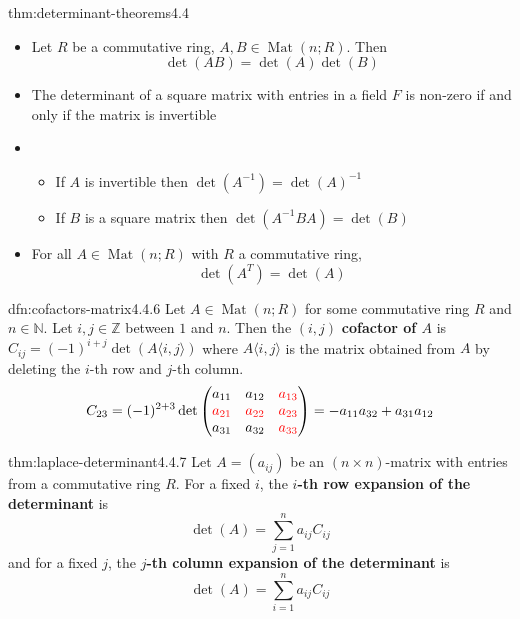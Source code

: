 \documentclass[landscape, 8pt]{extarticle}
\DeclareMathOperator{\Mat}{Mat}
\begin{document}
\begin{multicols}{3}
\begin{thm}{thm:determinant-theorems}{4.4}
    \begin{itemize}
        \item[\textbf{4.4.1}:] Let $R$ be a commutative ring, $A, B\in \Mat(n; R)$. Then
            \[\det(AB) = \det(A)\det(B)\]
        \item[\textbf{4.4.2}:] The determinant of a square matrix with entries in a field $F$ is non-zero if and only if the matrix is invertible
        \item[\textbf{4.4.3}:] \begin{itemize}
            \item If $A$ is invertible then $\det(A^{-1}) = \det(A)^{-1}$
            \item If $B$ is a square matrix then $\det(A^{-1}BA) = \det(B)$
        \end{itemize} 
        \item[\textbf{4.4.4}:] For all $A\in \Mat(n;R)$ with $R$ a commutative ring,
    \[\det(A^{T}) = \det(A)\]

    \end{itemize}
\end{thm}

\begin{dfn}{dfn:cofactors-matrix}{4.4.6}
    Let $A \in \Mat(n;R)$ for some commutative ring $R$ and $n\in \mathbb{N}$. Let $i,j\in\mathbb{Z}$ between $1$ and $n$. Then the $(i, j)$ \textbf{cofactor of $A$} is $C_{ij} = (-1)^{i + j} \det(A\langle i,j \rangle)$ where $A\langle i, j \rangle$ is the matrix obtained from $A$ by deleting the $i$-th row and $j$-th column.
    \[C_{23} = (-1)^{2 + 3} \det \begin{pmatrix}
        a_{11} & a_{12}& \textcolor{red}{a_{13}}\\
        \textcolor{red}{a_{21}}& \textcolor{red}{a_{22}}& \textcolor{red}{a_{23}}\\
        a_{31}& a_{32}& \textcolor{red}{a_{33}}
    \end{pmatrix} = -a_{11}a_{32} + a_{31}a_{12}\]
\end{dfn}

\begin{thm}{thm:laplace-determinant}{4.4.7}
    Let $A = (a_{ij})$ be an $(n \times n)$-matrix with entries from a commutative ring $R$. For a fixed $i$, the \textbf{$i$-th row expansion of the determinant} is
    \[\det(A) = \sum_{j = 1}^{n}a_{ij}C_{ij}\]
    and for a fixed $j$, the \textbf{$j$-th column expansion of the determinant} is
    \[\det(A) = \sum_{i = 1}^{n} a_{ij} C_{ij}\]
\end{thm}


\end{multicols}
\end{document}
